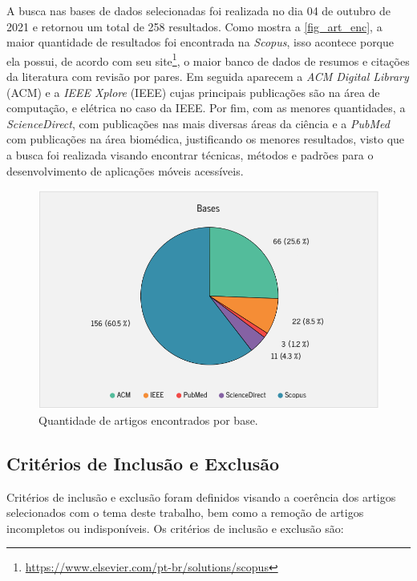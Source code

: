 A busca nas bases de dados selecionadas foi realizada no dia 04 de outubro de 2021 e retornou um total de 258 resultados. Como mostra a \autoref{fig_art_enc}, a maior quantidade de resultados foi encontrada na \emph{Scopus}, isso acontece porque ela possui, de acordo com seu site\footnote{\url{https://www.elsevier.com/pt-br/solutions/scopus}}, o maior banco de dados de resumos e citações da literatura com revisão por pares. Em seguida aparecem a \emph{ACM Digital Library} (ACM) e a \emph{IEEE Xplore} (IEEE) cujas principais publicações são na área de computação, e elétrica no caso da IEEE. Por fim, com as menores quantidades, a \emph{ScienceDirect}, com publicações nas mais diversas áreas da ciência e a \emph{PubMed} com publicações na área biomédica, justificando os menores resultados, visto que a busca foi realizada visando encontrar técnicas, métodos e padrões para o desenvolvimento de aplicações móveis acessíveis.

\begin{figure}[htb]
	\caption{\label{fig_art_enc}Quantidade de artigos encontrados por base.}
	\begin{center}
	    \includegraphics[scale=0.7]{Imagens/msl/artigos_encontrados.png}
	\end{center}
\end{figure}

\subsection{Critérios de Inclusão e Exclusão}

Critérios de inclusão e exclusão foram definidos visando a coerência dos artigos selecionados com o tema deste trabalho, bem como a remoção de artigos incompletos ou indisponíveis. Os critérios de inclusão e exclusão são:

